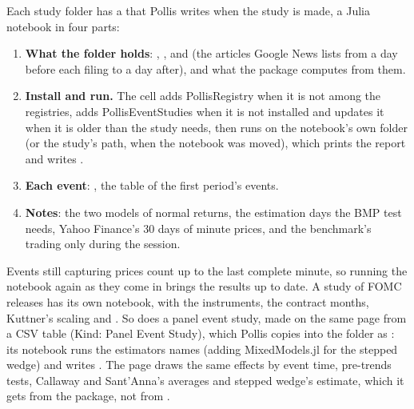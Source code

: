 Each study folder has a  that Pollis writes when the study is made, a Julia notebook in four parts:
\begin{enumerate}
  \item \textbf{What the folder holds}: , ,  and  (the articles
    Google News lists from a day before each filing to a day after), and what the package computes from them.
  \item \textbf{Install and run.} The cell adds PollisRegistry when it is not among the registries, adds
    PollisEventStudies when it is not installed and updates it when it is older than the study needs, then runs
     on the notebook's own folder (or the study's path, when the notebook was moved), which prints the
    report and writes .
  \item \textbf{Each event}: , the table of the first period's events.
  \item \textbf{Notes}: the two models of normal returns, the estimation days the BMP test needs, Yahoo Finance's 30
    days of minute prices, and the benchmark's trading only during the session.
\end{enumerate}
Events still capturing prices count up to the last complete minute, so running the notebook again as they come in
brings the results up to date. A study of FOMC releases has its own notebook, with the instruments, the contract
months, Kuttner's scaling and . So does a panel event study, made on the same page from a CSV
table (Kind: Panel Event Study), which Pollis copies into the folder as : its notebook runs the estimators
 names (adding MixedModels.jl for the stepped wedge) and writes . The page draws the same
effects by event time, pre-trends tests, Callaway and Sant'Anna's averages and stepped wedge's estimate, which it gets
from the package, not from .

